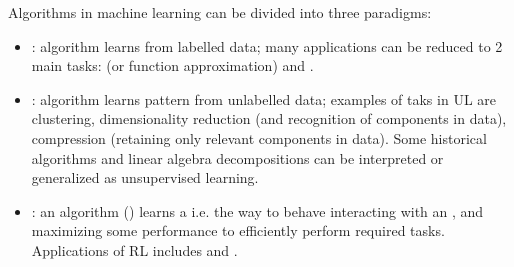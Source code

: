 \documentclass[letterpaper,10pt,english]{jupyterBook}
\begin{document}
\sphinxAtStartPar
{} Algorithms in machine learning can be divided into three paradigms:
\begin{itemize}
\item {} 
\sphinxAtStartPar
{\hyperref[\detokenize{ch/ml/sl:ml-sl}]{}}: algorithm learns from labelled data; many applications can be reduced to 2 main tasks:  (or function approximation) and .

\item {} 
\sphinxAtStartPar
{\hyperref[\detokenize{ch/ml/ul:ml-ul}]{}}: algorithm learns pattern from un\sphinxhyphen{}labelled data; examples of taks in UL are clustering, dimensionality reduction (and recognition of  components in data), compression (retaining only relevant components in data). Some historical algorithms and linear algebra decompositions can be interpreted or generalized as unsupervised learning.

\item {} 
\sphinxAtStartPar
{\hyperref[\detokenize{ch/ml/rl:ml-rl}]{}}: an algorithm () learns a  \sphinxhyphen{} i.e. the way to behave \sphinxhyphen{} interacting with an , and maximizing some performance to efficiently perform required tasks. Applications of RL includes  and .

\end{itemize}
\end{document}

